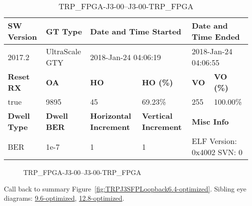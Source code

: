 \begin{table}[h]
\centering
\caption{TRP\_FPGA-J3-00--J3-00-TRP\_FPGA}
\label{tab:TRPFPGAJ300J300TRPFPGA6.4-optimized}
\begin{tabular}{@{}|l|l|l|l|l|l|@{}}
\toprule
\textbf{SW Version}                & \textbf{GT Type}   & \multicolumn{2}{l|}{\textbf{Date and Time Started}}            & \multicolumn{2}{l|}{\textbf{Date and Time Ended}}        \\ \midrule
2017.2                       & UltraScale GTY          & \multicolumn{2}{l|}{2018-Jan-24 04:06:19}                   & \multicolumn{2}{l|}{2018-Jan-24 04:06:55}               \\ \midrule
\textbf{Reset RX}                  & \textbf{OA} & \textbf{HO}   & \textbf{HO (\%)} & \textbf{VO} & \textbf{VO (\%)} \\ \midrule
true & 9895        & 45          & 69.23\%        & 255        & 100.00\%       \\ \midrule
\textbf{Dwell Type}                & \textbf{Dwell BER} & \textbf{Horizontal Increment} & \textbf{Vertical Increment}    & \multicolumn{2}{l|}{\textbf{Misc Info}}                  \\ \midrule
BER                            & 1e-7        & 1        & 1           & \multicolumn{2}{l|}{ELF Version: 0x4002 SVN: 0}                         \\ \bottomrule
\end{tabular}
\end{table}

\begin{figure}[h]
\caption{TRP\_FPGA-J3-00--J3-00-TRP\_FPGA} \label{fig:TRPFPGAJ300J300TRPFPGA6.4-optimized}
\end{figure}

Call back to summary Figure~\ref{fig:TRPJ3SFPLoopback6.4-optimized}.
Sibling eye diagrams: \hyperref[sec:TRPFPGAJ300J300TRPFPGA9.6-optimized]{9.6-optimized}, \hyperref[sec:TRPFPGAJ300J300TRPFPGA12.8-optimized]{12.8-optimized}.

\clearpage
\newpage

